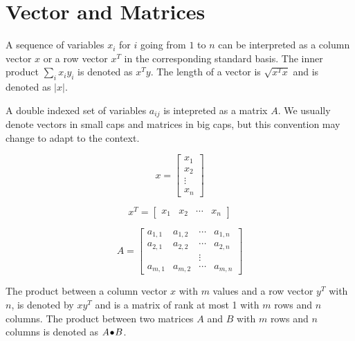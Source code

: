 \documentclass[a4paper,justified]{tufte-handout}
\begin{document}
 


\section{Vector and Matrices}

A sequence of variables $ x_{i} $ for $i$ going from $ 1$ to $n$ can
be interpreted as a column vector $ x $ or a row vector $ x^{T} $ in
the corresponding standard basis. The inner product $ \sum_{i} x_{i}
y_{i} $ is denoted as $ x^{T}y $.  The length of a vector is
$\sqrt{x^{T}x} $ and is denoted as $ |x| $.


A double indexed set of variables $
a_{ij} $ is intepreted as a matrix $ A $. We usually denote vectors in
small caps and matrices in big caps, but this convention may change to
adapt to the context.

\begin{figure*}\label{fig:arrayconvention}
\begin{minipage}[c]{0.20\textwidth}
\[
x=\begin{bmatrix}
  x_{1}\\
  x_{2}\\
  \vdots\\
  x_{n}
\end{bmatrix}
\]
\end{minipage}
\begin{minipage}[c]{0.40\textwidth}
\[
x^{T}=\begin{bmatrix}
  x_{1} & x_{2} & \cdots & x_{n} 
\end{bmatrix}
\]
\end{minipage}
\begin{minipage}[c]{0.40\textwidth}
\[
A=\begin{bmatrix}
  a_{1,1} & a_{1,2} & \cdots & a_{1,n} \\
  a_{2,1} & a_{2,2} & \cdots & a_{2,n} \\
  & & \vdots & \\
  a_{m,1} & a_{m,2} & \cdots & a_{m,n}
\end{bmatrix}
\]
\end{minipage}
\end{figure*}

The product between a column vector $ x $ with $ m $ values and a row
vector $ y^{T} $ with $ n $, is denoted by $ xy^{T} $ and is a matrix
of rank at most 1 with $ m $ rows and $ n $ columns. The product
between two matrices $ A $ and $ B $ with $ m $ rows and $ n $ columns
is denoted as ${A}\!\bullet\!{B}$.
\end{document}
